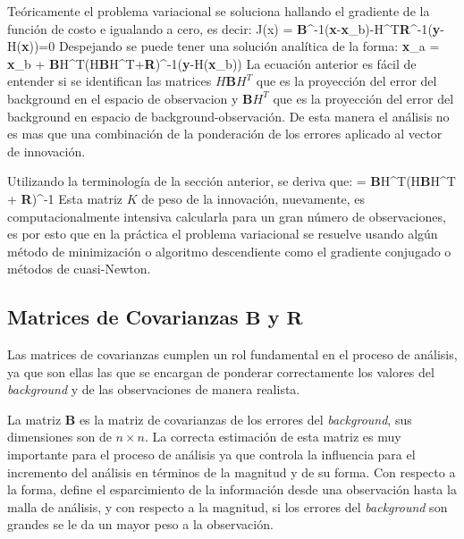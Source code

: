 Teóricamente el problema variacional se soluciona hallando el gradiente de la función de costo e igualando a cero, es decir:
\be 
\nabla J(x) = \textbf{B}^{-1}(\textbf{x}-\textbf{x}_b)-H^T\textbf{R}^{-1}(\textbf{y}-H(\textbf{x}))=0
\ee
Despejando se puede tener una solución analítica de la forma:
\be \label{eq:03_dataassim}
\textbf{x}_a = \textbf{x}_b + \textbf{B}H^T(H\textbf{B}H^T+\textbf{R})^{-1}(\textbf{y}-H(\textbf{x}_b)) 
\ee
La ecuación anterior es fácil de entender si se identifican las matrices $H\textbf{B}H^T$ que es la proyección del error del background en el espacio de observacion y $\textbf{B}H^T$ que es la proyección del error del background en espacio de background-observación. De esta manera el análisis no es mas que una combinación de la ponderación de los errores aplicado al vector de innovación.

Utilizando la terminología de la sección anterior, se deriva que:
\be
{} = \textbf{B}H^{T}(H\textbf{B}H^T + \textbf{R})^{-1}
\ee 
Esta matriz $K$ de peso de la innovación, nuevamente, es computacionalmente intensiva calcularla para un gran número de observaciones, es por esto que en la práctica el problema variacional se resuelve usando algún método de minimización o algoritmo descendiente como el gradiente conjugado o métodos de cuasi-Newton.
\subsection{Matrices de Covarianzas $\textbf{B}$ y $\textbf{R}$}
Las matrices de covarianzas cumplen un rol fundamental en el proceso de análisis, ya que son ellas las que se encargan de ponderar correctamente los valores del \emph{background} y de las observaciones de manera realista. 

La matriz $\textbf{B}$ es la matriz de covarianzas de los errores del \emph{background}, sus dimensiones son de $n\times n$. La correcta estimación de esta matriz es muy importante para el proceso de análisis ya que  controla la influencia para el incremento del análisis en términos de la magnitud y de su forma. Con respecto a la forma, define el esparcimiento de la información desde una observación hasta la malla de análisis, y con respecto a la magnitud, si los errores del \emph{background} son grandes se le da un mayor peso a la observación.

